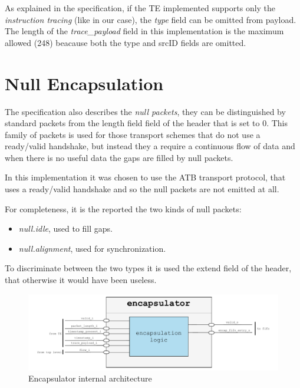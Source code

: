 As explained in the specification, if the TE implemented supports only the \textit{instruction 
tracing} (like in our case), the \textit{type} field can be omitted from payload.
The length of the \textit{trace\_payload} field in this implementation is the maximum allowed 
(248) beacause both the type and srcID fields are omitted.

\section{Null Encapsulation}
The specification also describes the \textit{null packets}, they can be distinguished by standard 
packets from the length field field of the header that is set to 0. 
This family of packets is used for those transport schemes that do not use a ready/valid 
handshake, but instead they a require a continuous flow of data and when there is no useful data 
the gaps are filled by null packets.

In this implementation it was chosen to use the ATB transport protocol, that uses a ready/valid 
handshake and so the null packets are not emitted at all.

For completeness, it is the reported the two kinds of null packets:
\begin{itemize}
    \item   \textit{null.idle}, used to fill gaps.
    \item   \textit{null.alignment}, used for synchronization.
\end{itemize}

To discriminate between the two types it is used the extend field of the header, that otherwise 
it would have been useless.

\begin{figure}[H]
    \centering
    \includegraphics[width=1\textwidth]{img/encapsulator.pdf}
    \caption{Encapsulator internal architecture}
    \label{fig:encapsulator_internal_architecture}
\end{figure}